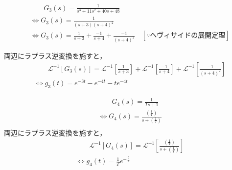 \documentclass[a4paper,12pt]{article}
\begin{document}
\begin{tcolorbox}[title={1. (3) \( G_3(s)=\frac{ 1 }{ s^3 + 11 s^2+ 40s + 48 } \) }]
    \vspace{-3mm}
  \begin{align*}
      &\qquad G_3(s) =\frac{ 1 }{ s^3 + 11 s^2+ 40s + 48 }  \\
      &\Leftrightarrow G_3(s) =\frac{ 1 }{ (s+3)(s+4)^2 }  \\
      &\Leftrightarrow G_3(s) 
      = \frac{1}{s+3}
      + \frac{-1}{s + 4}
      + \frac{-1}{(s + 4)^2}
      \quad [\because ヘヴィサイドの展開定理]
  \end{align*}
  
  \quad 両辺にラプラス逆変換を施すと，
  \vspace{-3mm}
  \begin{align*}
      &\qquad \mathcal{L}^{-1} \left[ G_3(s) \right] 
      =\mathcal{L}^{-1} \left[ \frac{1}{s+3} \right]
      +\mathcal{L}^{-1} \left[ \frac{-1}{s + 4} \right]
      +\mathcal{L}^{-1} \left[ \frac{-1}{(s + 4)^2} \right] \\
      &\Leftrightarrow g_3(t) = e^{-3t} - e^{-4t} - te^{-4t}
  \end{align*}
\end{tcolorbox}

\begin{tcolorbox}[title={1. (4) \( G_4(s)=\frac{1}{Ts+1} \)}]
    \begin{align*}
        &\qquad G_4(s) =\frac{1}{Ts+1}  \\
        &\Leftrightarrow G_4(s) =\frac{(\frac{1}{T})}{ s+(\frac{1}{T})} \\
    \end{align*}
    \quad 両辺にラプラス逆変換を施すと，
    \vspace{-3mm}
    \begin{align*}
        &\qquad \mathcal{L}^{-1} \left[ G_4(s) \right] 
        =\mathcal{L}^{-1} \left[ \frac{(\frac{1}{T})}{ s+(\frac{1}{T})} \right] \\
        &\Leftrightarrow g_4(t) = \frac{1}{T} e^{-\frac{t}{T}}
    \end{align*}
\end{tcolorbox}
\end{document}
